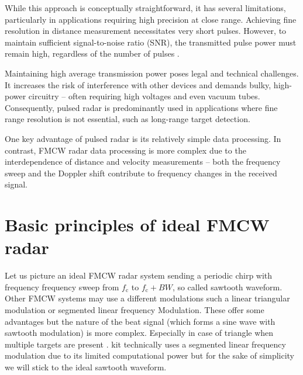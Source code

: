 While this approach is conceptually straightforward, it has several limitations, particularly in applications requiring high precision at close range.
Achieving fine resolution in distance measurement necessitates very short pulses.
However, to maintain sufficient signal-to-noise ratio (SNR), the transmitted pulse power must remain high, regardless of the number of pulses \cite{jankiraman2018}.

Maintaining high average transmission power poses legal and technical challenges.
It increases the risk of interference with other devices and demands bulky, high-power circuitry -- often requiring high voltages and even vacuum tubes.
Consequently, pulsed radar is predominantly used in applications where fine range resolution is not essential, such as long-range target detection.

One key advantage of pulsed radar is its relatively simple data processing.
In contrast, FMCW radar data processing is more complex due to the interdependence of distance and velocity measurements -- both the frequency sweep and the Doppler shift contribute to frequency changes in the received signal.

\section{Basic principles of ideal FMCW radar}

Let us picture an ideal FMCW radar system sending a periodic chirp with frequency frequency sweep from $f_\mathrm{c}$ to $f_\mathrm{c}+BW$, so called sawtooth waveform.
Other FMCW systems may use a different modulations such a linear triangular modulation or segmented linear frequency Modulation.
These offer some advantages but the nature of the beat signal (which forms a sine wave with sawtooth modulation) is more complex.
Especially in case of triangle when multiple targets are present \cite{jankiraman2018}.
\sidar kit technically uses a segmented linear frequency modulation due to its limited computational power \cite{sidarPRO} but for the sake of simplicity we will stick to the ideal sawtooth waveform.

